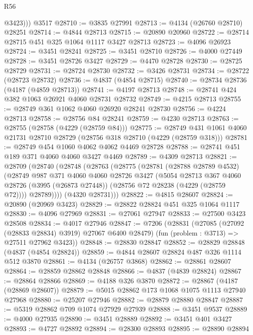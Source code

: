 \begin{lexlean}{R56}
\begin{coremodule}
          @3423)))
    @3517
@28710 := @3835 @27991
@28713 := @4134 (@26760 @28710) @28251
@28714 := @4844 @28713
@28715 := @20890 @20960
@28722 := @28714 @28715 @451 @325 @1064 @1117 @3427 @28713
@28723 := @4096 @26923
@28724 := @3451 @28241
@28725 := @3451 @28710
@28726 := @4000 @27449
@28728 := @3451 @28726 @3427
@28729 := @4470 @28728
@28730 := @28725 @28729
@28731 := @28724 @28730
@28732 := @3426 @28731
@28734 := @28722 (@28723 @28732)
@28736 := @4837 (@4854 @28715)
@28740 := @28734 @28736 (@4187 (@4859 @28713))
@28741 := @4197 @28713
@28748 := @28741 @424 @382 @1063 @26921 @4060 @28731 @28732
@28749 := @4215 @28713
@28755 := @28749 @361 @1062 @4060 @26920 @28241 @28730
@28756 := @4224 @28713
@28758 := @28756 @84 @28241
@28759 := @4230 @28713
@28763 := @28755 (@28758 (@4229 (@28759 @84)))
@28775 := @28749 @431 @1061 @4060 @21731 @28710 @28729 (@28756 @318 @28710 (@4229 (@28759 @318)))
@28781 := @28749 @454 @1060 @4062 @4062 @4469 @28728
@28788 := @28741 @451 @189 @371 @4060 @4060 @3427 @4469
@28789 := @4309 @28713
@28821 := @28709
    (@28740
      (@28748
        (@28763
          (@28775
            (@28781
              (@28788 @28789 @4532)
              (@28749
                @987
                @371
                @4060
                @4060
                @28726
                @3427
                (@5054
                  @28713
                  @367
                  @4060
                  @28726
                  (@3995 (@26873 @27448))
                  (@28756 @72 @28238 (@4229 (@28759 @72))))
                @28789))))
        (@4320 @28731)))
@28822 := @4815 @28607
@28824 := @20890 (@20969 @3423)
@28829 := @28822 @28824 @451 @325 @1064 @1117
@28830 := @4096 @27969
@28831 := @27061 @27947
@28833 := @27500 @3423 @28508
@28834 := @4017 @27946
@28847 := @7206
    (@28831
      (@27085 (@27092 (@28833 @28834) @3919) @27067 @6400 @28479)
      (fun (problem : @3713) => @27511 @27962 @3423))
@28848 := @28830 @28847
@28852 := @28829 @28848 (@4837 (@4854 @28824))
@28859 := @4844 @28607 @28824 @487 @326 @1114 @512 @3870
@28861 := @4134 (@26757 @3868)
@28862 := @28861 @28607
@28864 := @28859 @28862 @28848
@28866 := @4837 (@4839 @28824)
@28867 := @28864 @28866
@28869 := @4188 @326 @3870
@28872 := @28867 (@4187 (@28869 @28607))
@28879 := @5015 @28862 @173 @1068 @1075 @1113 @27940 @27968
@28880 := @25207 @27946
@28882 := @28879 @28880 @28847
@28887 := @5319 @28862 @709 @1074 @27929 @27939
@28888 := @3451 @9537
@28889 := @4000 @27935
@28890 := @3451 @28889
@28892 := @3451 @401 @3427
@28893 := @4727 @28892
@28894 := @28300 @28893
@28895 := @28890 @28894

\end{coremodule}
\end{lexlean}
